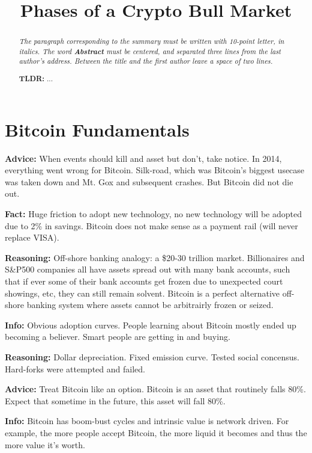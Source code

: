 \documentclass[10pt,twocolumn]{article}
\title{Phases of a Crypto Bull Market\vspace{-2em}}
\date{}
\begin{document}
\setlength{\parindent}{0pt}
\setlength{\footskip}{1.5em}
\maketitle
\begin{abstract}
{\em The paragraph corresponding to the summary must be written with 10-point
letter, in italics. The word {\bf Abstract} must be centered, and separated
three lines from the last author's address. Between the title and the first
author leave a space of two lines.}
    
{\bf TLDR:} ...
\end{abstract}

\section{Bitcoin Fundamentals}

{\bf Advice:} When events should kill and asset but don't, take notice. In 2014,
everything went wrong for Bitcoin. Silk-road, which was Bitcoin's biggest
usecase was taken down and Mt. Gox and subsequent crashes. But Bitcoin did not
die out. 

{\bf Fact:} Huge friction to adopt new technology, no new technology will be
adopted due to 2\% in savings. Bitcoin does not make sense as a payment rail
(will never replace VISA). 

{\bf Reasoning:} Off-shore banking analogy: a \$20-30 trillion market.
Billionaires and S\&P500 companies all have assets spread out with many bank
accounts, such that if ever some of their bank accounts get frozen due to
unexpected court showings, etc, they can still remain solvent. Bitcoin is a
perfect alternative off-shore banking system where assets cannot be arbitrairly
frozen or seized. 

{\bf Info:} Obvious adoption curves. People learning about Bitcoin mostly ended
up becoming a believer. Smart people are getting in and buying. 

{\bf Reasoning:} Dollar depreciation. Fixed emission curve. Tested social
concensus. Hard-forks were attempted and failed. 

{\bf Advice:} Treat Bitcoin like an option. Bitcoin is an asset that routinely
falls 80\%. Expect that sometime in the future, this asset will fall 80\%. 

{\bf Info:} Bitcoin has boom-bust cycles and intrinsic value is network driven.
For example, the more people accept Bitcoin, the more liquid it becomes and thus
the more value it's worth. 
\end{document}
